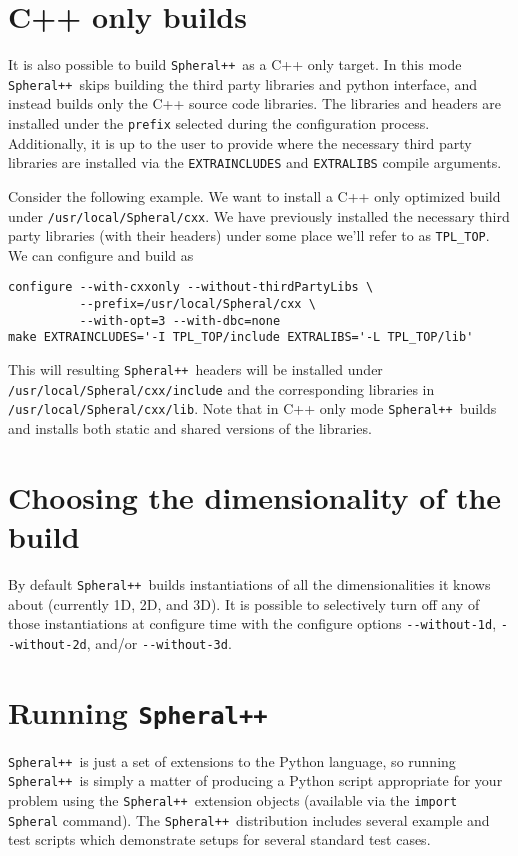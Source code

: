 \documentclass{article}
\newcommand{\Spheral}{{\tt Spheral++}}
\begin{document}
\section{C++ only builds}

It is also possible to build \Spheral\ as a C++ only target.  In this mode \Spheral\ skips building the third party libraries and python interface, and instead builds only the C++ source code libraries.  The libraries and headers are installed under the \verb.prefix. selected during the configuration process.  Additionally, it is up to the user to provide where the necessary third party libraries are installed via the \verb.EXTRAINCLUDES. and \verb.EXTRALIBS. compile arguments.

Consider the following example.  We want to install a C++ only optimized build under \verb./usr/local/Spheral/cxx..  We have previously installed the necessary third party libraries (with their headers) under some place we'll refer to as \verb.TPL_TOP..  We can configure and build as

\begin{verbatim}
configure --with-cxxonly --without-thirdPartyLibs \ 
          --prefix=/usr/local/Spheral/cxx \ 
          --with-opt=3 --with-dbc=none 
make EXTRAINCLUDES='-I TPL_TOP/include EXTRALIBS='-L TPL_TOP/lib'
\end{verbatim}

This will resulting \Spheral\ headers will be installed under \verb./usr/local/Spheral/cxx/include. and the corresponding libraries in \verb./usr/local/Spheral/cxx/lib..  Note that in C++ only mode \Spheral\ builds and installs both static and shared versions of the libraries.

\section{Choosing the dimensionality of the build}

By default \Spheral\ builds instantiations of all the dimensionalities it knows about (currently 1D, 2D, and 3D).  It is possible to selectively turn off any of those instantiations at configure time with the configure options \verb.--without-1d., \verb.--without-2d., and/or \verb.--without-3d..

\section{Running \Spheral}
\Spheral\ is just a set of extensions to the Python language, so running \Spheral\ is simply a matter of producing a Python script appropriate for your problem using the \Spheral\ extension objects (available via the \verb+import Spheral+ command).  The \Spheral\ distribution includes several example and test scripts which demonstrate setups for several standard test cases.
\end{document}
